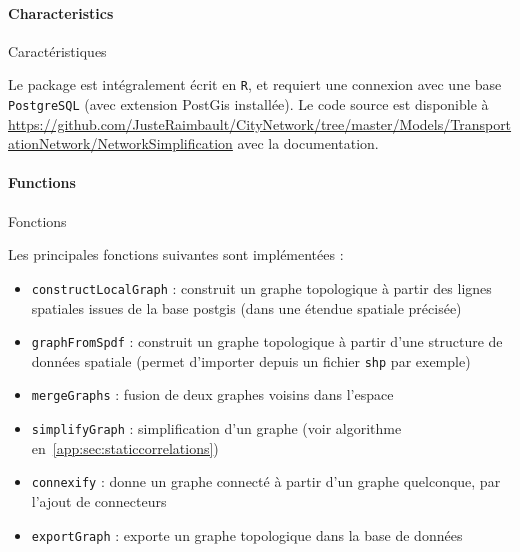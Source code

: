 

\paragraph{Characteristics}{Caractéristiques}


Le package est intégralement écrit en \texttt{R}, et requiert une connexion avec une base \texttt{PostgreSQL} (avec extension PostGis installée). Le code source est disponible à \url{https://github.com/JusteRaimbault/CityNetwork/tree/master/Models/TransportationNetwork/NetworkSimplification} avec la documentation.

\paragraph{Functions}{Fonctions}

Les principales fonctions suivantes sont implémentées :
\begin{itemize}
	\item \texttt{constructLocalGraph} : construit un graphe topologique à partir des lignes spatiales issues de la base postgis (dans une étendue spatiale précisée)
	\item \texttt{graphFromSpdf} : construit un graphe topologique à partir d'une structure de données spatiale (permet d'importer depuis un fichier \texttt{shp} par exemple)
	\item \texttt{mergeGraphs} : fusion de deux graphes voisins dans l'espace
	\item \texttt{simplifyGraph} : simplification d'un graphe (voir algorithme en~\ref{app:sec:staticcorrelations})
	\item \texttt{connexify} : donne un graphe connecté à partir d'un graphe quelconque, par l'ajout de connecteurs
	\item \texttt{exportGraph} : exporte un graphe topologique dans la base de données
\end{itemize}

